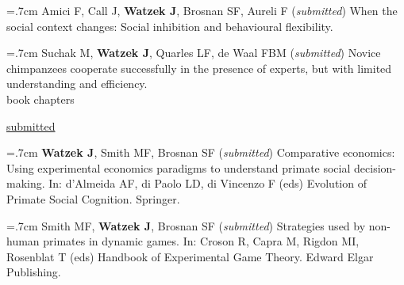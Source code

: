 \documentclass[]{friggeri-cv}
\begin{document}
\hangindent=.7cm Amici F, Call J, \textbf{Watzek J}, Brosnan SF, Aureli F (\emph{submitted}) When the social context changes: Social inhibition and behavioural flexibility.

\hangindent=.7cm Suchak M, \textbf{Watzek J}, Quarles LF, de Waal FBM (\emph{submitted}) Novice chimpanzees cooperate successfully in the presence of experts, but with limited understanding and efficiency. \\[.5cm]





{\subfont\large{} book chapters}


\hspace{.35cm} { \underline{submitted}}

\hangindent=.7cm \textbf{Watzek J}, Smith MF, Brosnan SF (\emph{submitted}) Comparative economics: Using experimental economics paradigms to understand primate social decision-making. In: d'Almeida AF, di Paolo LD, di Vincenzo F (eds) Evolution of Primate Social Cognition. Springer.

\hangindent=.7cm Smith MF, \textbf{Watzek J}, Brosnan SF (\emph{submitted}) Strategies used by non-human primates in dynamic games. In: Croson R, Capra M, Rigdon MI, Rosenblat T (eds) Handbook of Experimental Game Theory. Edward Elgar Publishing.



\newpage
\thispagestyle{fancy}

\renewenvironment{aside}{%
  \let\oldsection\section
  \renewcommand{\section}[1]{
    \par\vspace{\baselineskip}{\Large\headingfont\color{headercolor} ##1}
  }
  \begin{textblock}{3.6}(1.5, 1.5)
  \begin{flushright}
  \obeycr
}{%
  \restorecr
  \end{flushright}
  \end{textblock}
  \let\section\oldsection
}
\end{document}
